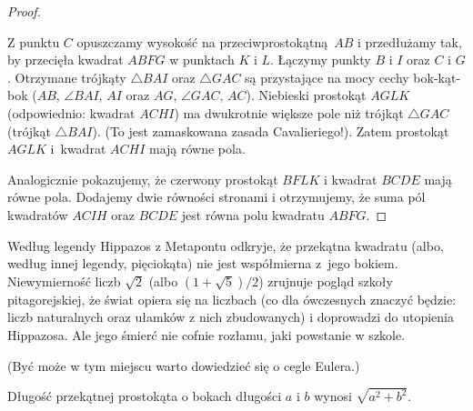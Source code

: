 \begin{proof}
\begin{center}
\begin{comment}
        \tkzDefSquare(C,B)
        \tkzGetPoints{E}{D}
        \tkzDrawPolygon[line width=0.3mm,fill=red!40](C,B,E,D)
        \tkzLabelPoint[above](D){$D$}
        \tkzLabelPoint[below](E){$E$}
        \tkzDefSquare(A,C)
        \tkzGetPoints{H}{I}
        \tkzDrawPolygon[line width=0.3mm, fill=blue!40](A,C,H,I)
        \tkzLabelPoint[above right](H){$H$}
        \tkzLabelPoint[above right](I){$I$}
        \tkzDrawSegments[line width=0.2mm](C,G)
        \tkzDrawSegments[line width=0.2mm, dashed](C,K)
        \tkzDrawSegments[line width=0.2mm](I,B)
        \tkzDrawPolygon[line width=0.5mm](A,B,C)
    \end{tikzpicture}
\end{comment}
    \end{center}
    Z punktu $C$ opuszczamy wysokość na przeciwprostokątną $AB$ i przedłużamy tak, by przecięła kwadrat $ABFG$ w punktach $K$ i $L$.
    Łączymy punkty $B$ i $I$ oraz $C$ i $G$.
    Otrzymane trójkąty $\triangle BAI$ oraz $\triangle GAC$ są przystające na mocy cechy bok-kąt-bok ($AB$, $\angle BAI$, $AI$ oraz $AG$, $\angle GAC$, $AC$).
    Niebieski prostokąt $AGLK$ (odpowiednio: kwadrat $ACHI$) ma dwukrotnie większe pole niż trójkąt $\triangle GAC$ (trójkąt $\triangle BAI$).
    (To jest zamaskowana zasada Cavalieriego!).
    Zatem prostokąt $AGLK$ i~kwadrat $ACHI$ mają równe pola.
    
    Analogicznie pokazujemy, że czerwony prostokąt $BFLK$ i kwadrat $BCDE$ mają równe pola.
    Dodajemy dwie równości stronami i otrzymujemy, że suma pól kwadratów $ACIH$ oraz $BCDE$ jest równa polu kwadratu $ABFG$.
\end{proof}

Według legendy Hippazos z Metapontu odkryje, że przekątna kwadratu (albo, według innej legendy, pięciokąta) nie jest współmierna z~jego bokiem.
Niewymierność liczb $\sqrt{2}$ (albo $(1 + \sqrt 5) /2$) zrujnuje pogląd szkoły pitagorejskiej, że świat opiera się na liczbach (co dla ówczesnych znaczyć będzie: liczb naturalnych oraz ułamków z nich zbudowanych) i doprowadzi do utopienia Hippazosa.
%
%
Ale jego śmierć nie cofnie rozłamu, jaki powstanie w szkole.

(Być może w tym miejscu warto dowiedzieć się o cegle Eulera.)

\begin{corollary}
    Długość przekątnej prostokąta o bokach długości $a$ i $b$ wynosi $\sqrt{a^2 + b^2}$.
\end{corollary}

